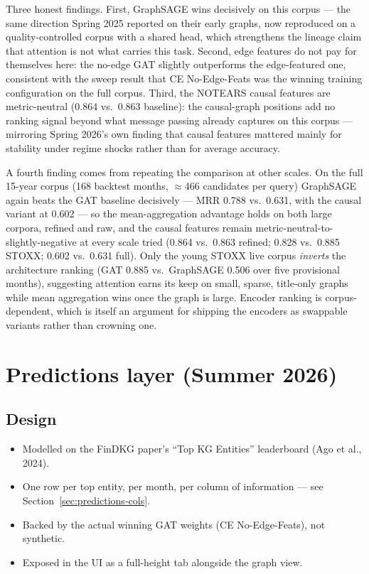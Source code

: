 \documentclass[11pt]{article}
\begin{document}
Three honest findings. First, GraphSAGE wins decisively on this corpus --- the same direction Spring 2025 reported on their early graphs, now reproduced on a quality-controlled corpus with a shared head, which strengthens the lineage claim that attention is not what carries this task. Second, edge features do not pay for themselves here: the no-edge GAT slightly outperforms the edge-featured one, consistent with the sweep result that CE No-Edge-Feats was the winning training configuration on the full corpus. Third, the NOTEARS causal features are metric-neutral (0.864 vs.\ 0.863 baseline): the causal-graph positions add no ranking signal beyond what message passing already captures on this corpus --- mirroring Spring 2026's own finding that causal features mattered mainly for stability under regime shocks rather than for average accuracy.

A fourth finding comes from repeating the comparison at other scales. On the full 15-year corpus (168 backtest months, \(\approx\)466 candidates per query) GraphSAGE again beats the GAT baseline decisively --- MRR 0.788 vs.\ 0.631, with the causal variant at 0.602 --- so the mean-aggregation advantage holds on both large corpora, refined and raw, and the causal features remain metric-neutral-to-slightly-negative at every scale tried (0.864 vs.\ 0.863 refined; 0.828 vs.\ 0.885 STOXX; 0.602 vs.\ 0.631 full). Only the young STOXX live corpus \emph{inverts} the architecture ranking (GAT 0.885 vs.\ GraphSAGE 0.506 over five provisional months), suggesting attention earns its keep on small, sparse, title-only graphs while mean aggregation wins once the graph is large. Encoder ranking is corpus-dependent, which is itself an argument for shipping the encoders as swappable variants rather than crowning one.

\section{Predictions layer (Summer 2026)}
\label{sec:predictions}

\subsection{Design}
\begin{itemize}
  \item Modelled on the FinDKG paper's ``Top KG Entities'' leaderboard (Ago et al., 2024).
  \item One row per top entity, per month, per column of information --- see Section~\ref{sec:predictions-cols}.
  \item Backed by the actual winning GAT weights (CE No-Edge-Feats), not synthetic.
  \item Exposed in the UI as a full-height tab alongside the graph view.
\end{itemize}
\end{document}
